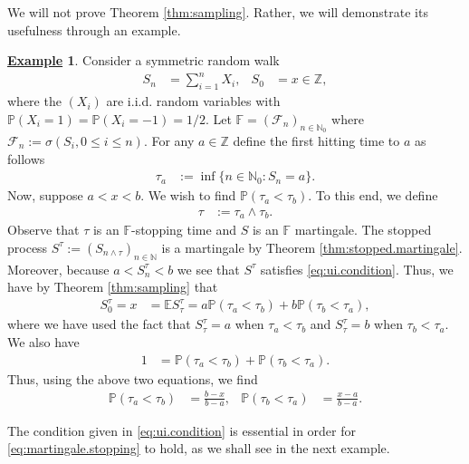 \documentclass[12pt]{book}
\numberwithin{equation}{chapter}
\theoremstyle{plain}
\numberwithin{theorem}{section}
\theoremstyle{definition}
\newtheorem{example}[theorem]{\underline{Example}}
\numberwithin{exercise}{chapter}
\newcommand{\<}{\langle}
\renewcommand{\>}{\rangle}
\renewcommand{\(}{\left(}
\renewcommand{\)}{\right)}
\renewcommand{\[}{\left[}
\renewcommand{\]}{\right]}
\newcommand\Eb{\mathds{E}}
\newcommand\Fb{\mathds{F}}
\newcommand\Pb{\mathds{P}}
\newcommand\Zb{\mathds{Z}}
\newcommand\Nb{\mathds{N}}
\newcommand\Fc{\mathscr{F}}
\newcommand\sig{\sigma}
\begin{document}
\noindent
We will not prove Theorem \ref{thm:sampling}.  Rather, we will demonstrate its usefulness through an example.

\begin{example}
Consider a symmetric random walk
\begin{align}
S_n
	&=	\sum_{i=1}^n X_i , &
S_0
	&=	x \in \Zb ,
\end{align}
where the $(X_i)$ are i.i.d. random variables with $\Pb( X_i = 1 ) = \Pb( X_i = - 1) = 1/2$.  
Let $\Fb = (\Fc_n)_{n \in \Nb_0}$ where $\Fc_n := \sig( S_i , 0 \leq i \leq n)$.
For any $a \in \Zb$ define the first hitting time to $a$ as follows
\begin{align}
\tau_a
	&:=	 \inf \{ n \in \Nb_0 : S_n = a \} .
\end{align}
Now, suppose $a < x < b$.  We wish to find $\Pb( \tau_a < \tau_b)$.  To this end, we define\
\begin{align}
\tau
	&:=	\tau_a \wedge \tau_b .
\end{align}
Observe that $\tau$ is an $\Fb$-stopping time and $S$ is an $\Fb$ martingale.  The stopped process $S^\tau := ( S_{n \wedge \tau} )_{n \in \Nb}$ is a martingale by Theorem \ref{thm:stopped.martingale}.  Moreover, because $a < S_n^\tau < b$ we see that $S^\tau$ satisfies \eqref{eq:ui.condition}.  Thus, we have by Theorem \ref{thm:sampling} that
\begin{align}
S_0^\tau = x
	&=	\Eb S_\tau^\tau
	=		a \Pb( \tau_a < \tau_b ) + b \Pb( \tau_b < \tau_a ) ,
\end{align}
where we have used the fact that $S_\tau^\tau = a$ when $\tau_a < \tau_b$ and $S_\tau^\tau = b$ when $\tau_b < \tau_a$.  We also have
\begin{align}
1
	&=		\Pb( \tau_a < \tau_b ) + \Pb( \tau_b < \tau_a ) .
\end{align}
Thus, using the above two equations, we find
\begin{align}
\Pb( \tau_a < \tau_b )
	&=	\frac{b - x}{b - a} , &
\Pb( \tau_b < \tau_a )
	&=	\frac{x - a}{b - a} .
\end{align}
\end{example}

\noindent
The condition given in \eqref{eq:ui.condition} is essential in order for \eqref{eq:martingale.stopping} to hold, as we shall see in the next example.
\end{document}
